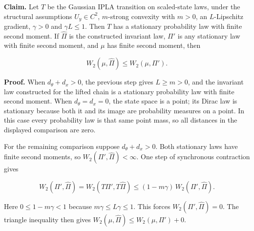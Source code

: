 \documentclass[11pt,a4paper]{report}
\begin{document}
\textbf{Claim.} Let \(T\) be the Gaussian IPLA transition on scaled-state laws, under the structural assumptions \(U_y\in C^2\), \(m\)-strong convexity with \(m>0\), an \(L\)-Lipschitz gradient, \(\gamma>0\) and \(\gamma L\le1\). Then \(T\) has a stationary probability law with finite second moment. If \(\widehat\Pi\) is the constructed invariant law, \(\Pi'\) is any stationary law with finite second moment, and \(\mu\) has finite second moment, then

\[W_2(\mu,\widehat\Pi)\le W_2(\mu,\Pi').\]

\textbf{Proof.} When \(d_\theta+d_x>0\), the previous step gives \(L\ge m>0\), and the invariant law constructed for the lifted chain is a stationary probability law with finite second moment. When \(d_\theta=d_x=0\), the state space is a point; its Dirac law is stationary because both it and its image are probability measures on a point. In this case every probability law is that same point mass, so all distances in the displayed comparison are zero.



For the remaining comparison suppose \(d_\theta+d_x>0\). Both stationary laws have finite second moments, so \(W_2(\Pi',\widehat\Pi)<\infty\). One step of synchronous contraction gives

\[W_2(\Pi',\widehat\Pi)=W_2(T\Pi',T\widehat\Pi)\le(1-m\gamma)\,W_2(\Pi',\widehat\Pi).\]

Here \(0\le1-m\gamma<1\) because \(m\gamma\le L\gamma\le1\). This forces \(W_2(\Pi',\widehat\Pi)=0\). The triangle inequality then gives \(W_2(\mu,\widehat\Pi)\le W_2(\mu,\Pi')+0\).
\end{document}
